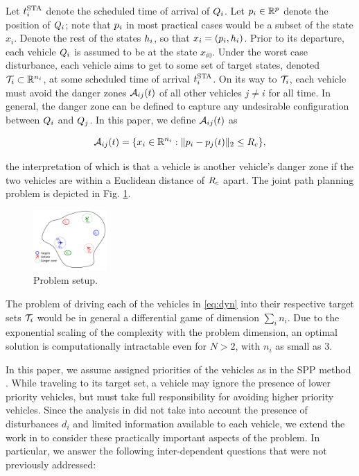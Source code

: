 Let $t^\text{STA}_i$ denote the scheduled time of arrival of $Q_i$. Let $p_i \in \mathbb{R}^p$ denote the position of $Q_i$; note that $p_i$ in most practical cases would be a subset of the state $x_i$. Denote the rest of the states $h_i$, so that $x_i = (p_i, h_i)$. Prior to its departure, each vehicle $Q_i$ is assumed to be at the state $x_{i0}$. Under the worst case disturbance, each vehicle aims to get to some set of target states, denoted $\mathcal{T}_i \subset \mathbb{R}^{n_i}$, at some scheduled time of arrival $t^\text{STA}_i$. On its way to $\mathcal{T}_i$, each vehicle must avoid the danger zones $\mathcal{A}_{ij}(t)$ of all other vehicles $j\neq i$ for all time. In general, the danger zone can be defined to capture any undesirable configuration between $Q_i$ and $Q_j$. In this paper, we define $\mathcal{A}_{ij}(t)$ as

\vspace{-0.5em} 
\begin{equation}
\mathcal{A}_{ij}(t) = \{x_i \in \mathbb{R}^{n_i}: \|p_i - p_j(t)\|_2 \le R_c \},
\end{equation}

\noindent the interpretation of which is that a vehicle is another vehicle's danger zone if the two vehicles are within a Euclidean distance of $R_c$ apart. The joint path planning problem is depicted in Fig. \ref{fig:form}.

\begin{figure}[h]
  \centering
  \includegraphics[width=0.25\textwidth]{"fig/formulation"}
  \caption{Problem setup.}
  \label{fig:form}
  \vspace{-1.5em}
\end{figure}
 
The problem of driving each of the vehicles in \eqref{eq:dyn} into their respective target sets $\mathcal{T}_i$ would be in general a differential game of dimension $\sum_i n_i$. Due to the exponential scaling of the complexity with the problem dimension, an optimal solution is computationally intractable even for $N>2$, with $n_i$ as small as $3$.

In this paper, we assume assigned priorities of the vehicles as in the SPP method \cite{Chen15}. While traveling to its target set, a vehicle may ignore the presence of lower priority vehicles, but must take full responsibility for avoiding higher priority vehicles. Since the analysis in \cite{Chen15} did not take into account the presence of disturbances $d_i$ and limited information available to each vehicle, we extend the work in \cite{Chen15} to consider these practically important aspects of the problem. In particular, we answer the following inter-dependent questions that were not previously addressed:

